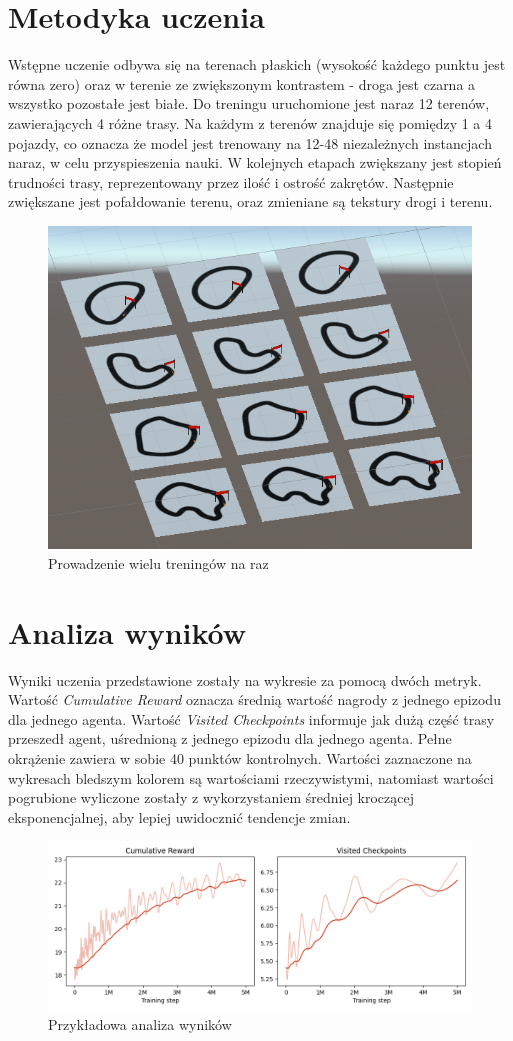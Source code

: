 \section{Metodyka uczenia}
Wstępne uczenie odbywa się na terenach płaskich (wysokość każdego punktu jest równa zero) oraz w terenie ze zwiększonym kontrastem - droga jest czarna a wszystko pozostałe jest białe. Do treningu uruchomione jest naraz 12 terenów, zawierających 4 różne trasy. Na każdym z terenów znajduje się pomiędzy 1 a 4 pojazdy, co oznacza że model jest trenowany na 12-48 niezależnych instancjach naraz, w celu przyspieszenia nauki. W kolejnych etapach zwiększany jest stopień trudności trasy, reprezentowany przez ilość i ostrość zakrętów. Następnie zwiększane jest pofałdowanie terenu, oraz zmieniane są tekstury drogi i terenu.
\begin{figure}[H]
    \centering
    \includegraphics[width=.5\textwidth]{figures/multiple_tests}
    \caption{Prowadzenie wielu treningów na raz}
    \label{fig}
\end{figure}

\section{Analiza wyników}
Wyniki uczenia przedstawione zostały na wykresie za pomocą dwóch metryk. Wartość \textit{Cumulative Reward} oznacza średnią wartość nagrody z jednego epizodu dla jednego agenta. Wartość \textit{Visited Checkpoints} informuje jak dużą część trasy przeszedł agent, uśrednioną z jednego epizodu dla jednego agenta. Pełne okrążenie zawiera w sobie 40 punktów kontrolnych. Wartości zaznaczone na wykresach bledszym kolorem są wartościami rzeczywistymi, natomiast wartości pogrubione wyliczone zostały z wykorzystaniem średniej kroczącej eksponencjalnej, aby lepiej uwidocznić tendencje zmian.

\begin{figure}[H]
    \centering
    \includegraphics[width=\textwidth]{graphs/example}
    \caption{Przykładowa analiza wyników}
    \label{fig}
\end{figure}

